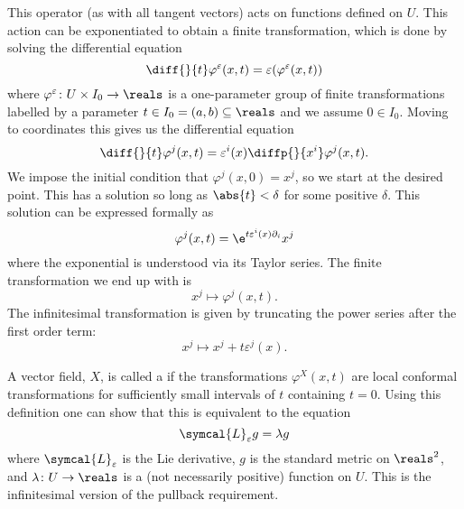 \documentclass[fleqn]{NotesClass}
\newcommand{\lieDerivative}{\symcal{L}}
\begin{document}
    This operator (as with all tangent vectors) acts on functions defined on \(U\).
    This action can be exponentiated to obtain a finite transformation, which is done by solving the differential equation
    \begin{equation}
        \diff{}{t} \varphi^{\varepsilon}(x, t) = \varepsilon(\varphi^\varepsilon(x, t))
    \end{equation}
    where \(\varphi^\varepsilon \colon U \times I_0\to \reals\) is a one-parameter group of finite transformations labelled by a parameter \(t \in I_0 = (a, b) \subseteq \reals\) and we assume \(0 \in I_0\).
    Moving to coordinates this gives us the differential equation
    \begin{equation}
        \diff{}{t} \varphi^j(x, t) = \varepsilon^i(x) \diffp{}{x^i} \varphi^j(x, t).
    \end{equation}
    We impose the initial condition that \(\varphi^j(x, 0) = x^j\), so we start at the desired point.
    This has a solution so long as \(\abs{t} < \delta\) for some positive \(\delta\).
    This solution can be expressed formally as
    \begin{equation}
        \varphi^j(x, t) = \e^{t \varepsilon^i(x) \partial_i}x^j
    \end{equation}
    where the exponential is understood via its Taylor series.
    The finite transformation we end up with is
    \begin{equation}
        x^j \mapsto \varphi^j(x, t).
    \end{equation}
    The infinitesimal transformation is given by truncating the power series after the first order term:
    \begin{equation}
        x^j \mapsto x^j + t\varepsilon^j(x).
    \end{equation}
    
    A vector field, \(X\), is called a  if the transformations \(\varphi^X(x, t)\) are local conformal transformations for sufficiently small intervals of \(t\) containing \(t = 0\).
    Using this definition one can show that this is equivalent to the equation
    \begin{equation}
        \lieDerivative_\varepsilon g = \lambda g
    \end{equation}
    where \(\lieDerivative_\varepsilon\) is the Lie derivative, \(g\) is the standard metric on \(\reals^2\), and \(\lambda \colon U \to \reals\) is a (not necessarily positive) function on \(U\).
    This is the infinitesimal version of the pullback requirement.
    
\end{document}
